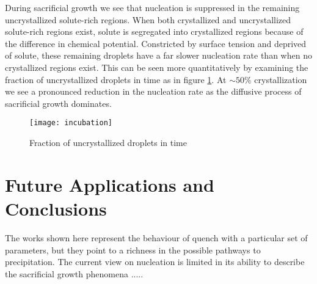 
During sacrificial growth we see that nucleation is suppressed in the remaining
uncrystallized solute-rich regions. When both crystallized and uncrystallized
solute-rich regions exist, solute is segregated into crystallized regions
because of the difference in chemical potential. Constricted by surface tension
and deprived of solute, these remaining droplets have a far slower nucleation
rate than when no crystallized regions exist. This can be seen more
quantitatively by examining the fraction of uncrystallized droplets in time as
in figure \ref{fig:incubation}. At $\sim 50\%$ crystallization we see a
pronounced reduction in the nucleation rate as the diffusive process of
sacrificial growth dominates.

\begin{figure}
    \centering
    \texttt{[image: incubation]}
    \caption[Fraction of uncrystallized droplets in time]{
        \label{fig:incubation}
        Fraction of uncrystallized droplets in time
    }
\end{figure}

\section{Future Applications and Conclusions} %


The works shown here represent the behaviour of quench with a particular set of
parameters, but they point to a richness in the possible pathways to
precipitation. The current view on nucleation is limited in its ability to describe
the sacrificial growth phenomena .....  



